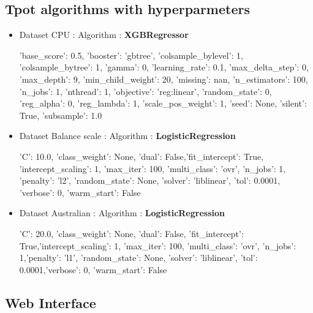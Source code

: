 \subsection{Tpot algorithms with hyperparmeters}
\label{tpot:hyp}
\begin{itemize}
\item 
Dataset CPU : Algorithm : \textbf{XGBRegressor}
\begin{spverbatim}
{'base_score': 0.5, 'booster': 'gbtree', 'colsample_bylevel': 1, 'colsample_bytree': 1, 'gamma': 0, 'learning_rate': 0.1, 
'max_delta_step': 0, 'max_depth': 9, 'min_child_weight': 20, 'missing': nan, 
'n_estimators': 100, 'n_jobs': 1, 'nthread': 1, 'objective': 'reg:linear', 
'random_state': 0, 'reg_alpha': 0, 'reg_lambda': 1, 'scale_pos_weight': 1, 
'seed': None, 'silent': True, 'subsample': 1.0}
\end{spverbatim}

\item

Dataset Balance scale : Algorithm : \textbf{LogisticRegression}
\begin{spverbatim}
{'C': 10.0, 'class_weight': None, 'dual': False,'fit_intercept': True,
'intercept_scaling': 1, 'max_iter': 100, 'multi_class': 'ovr', 'n_jobs': 1,
'penalty': 'l2', 'random_state': None, 'solver': 'liblinear', 'tol': 0.0001, 
'verbose': 0, 'warm_start': False}
\end{spverbatim}

\item

Dataset Australian : Algorithm : \textbf{LogisticRegression}
\begin{spverbatim}
{'C': 20.0, 'class_weight': None, 'dual': False, 
'fit_intercept': True,'intercept_scaling': 1, 'max_iter': 100,
'multi_class': 'ovr', 'n_jobs': 1,'penalty': 'l1', 'random_state': None, 'solver': 'liblinear', 'tol': 0.0001,'verbose': 0, 'warm_start': False}
\end{spverbatim}

\end{itemize}

\subsection{Web Interface}

